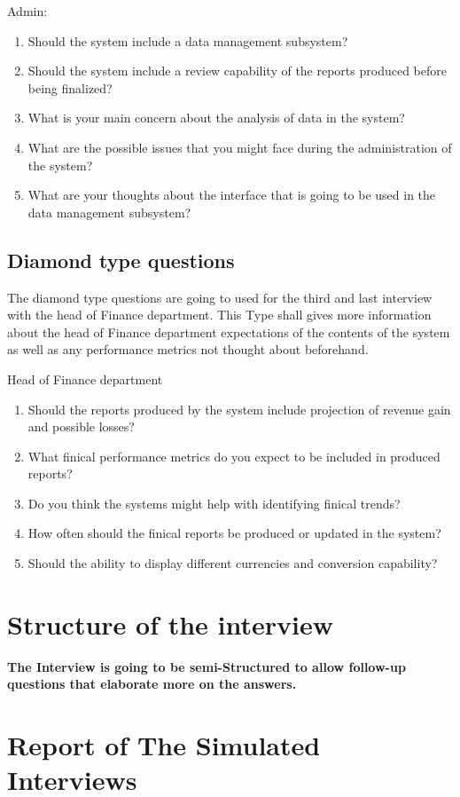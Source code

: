 \documentclass{article}
\begin{document}
Admin:
\begin{enumerate}
    \item Should the system include a data management subsystem?
    \item Should the system include a review capability of the reports produced before being finalized?
    \item What is your main concern about the analysis of data in the system?
    \item What are the possible issues that you might face during the administration of the system?
    \item What are your thoughts about the interface that is going to be used in the data management subsystem?
\end{enumerate}
\subsection{Diamond type questions}
The diamond type questions are going to used for the third and last interview with the head of Finance department. This Type shall gives more information about the head of Finance department expectations of the contents of the system as well as any performance metrics not thought about beforehand.

Head of Finance department
\begin{enumerate}
    \item Should the reports produced by the system include projection of revenue gain and possible losses?
    \item What finical performance metrics do you expect to be included in produced reports?
    \item Do you think the systems might help with identifying finical trends?
    \item How often should the finical reports be produced or updated in the system?
    \item Should the ability to display different currencies and conversion capability?
\end{enumerate}

\section{Structure of the interview}
\textbf{The Interview is going to be semi-Structured to allow follow-up questions that elaborate more on the answers.}

\section{Report of The Simulated Interviews}
\end{document}

